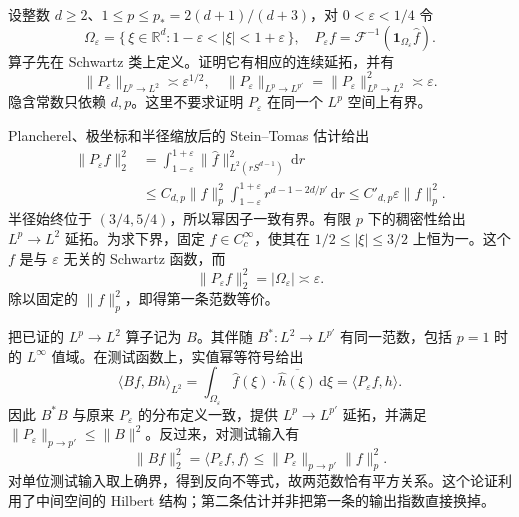 \begin{exercise}\label{b2:ex:23-new-3}
设整数 \(d\geq2\)、\(1\leq p\leq p_*=2(d+1)/(d+3)\)，对 \(0<\varepsilon<1/4\) 令
\[
 \Omega_\varepsilon=\{\,\xi\in\mathbb R^d:1-\varepsilon<|\xi|<1+\varepsilon\,\},
 \quad
 P_\varepsilon f=\mathcal F^{-1}(\mathbf1_{\Omega_\varepsilon}\widehat f).
\]
算子先在 Schwartz 类上定义。证明它有相应的连续延拓，并有
\[
 \|P_\varepsilon\|_{L^p\to L^2}\asymp\varepsilon^{1/2},
 \quad
 \|P_\varepsilon\|_{L^p\to L^{p'}}
   =\|P_\varepsilon\|_{L^p\to L^2}^2
   \asymp\varepsilon.
\]
隐含常数只依赖 \(d,p\)。这里不要求证明 \(P_\varepsilon\) 在同一个 \(L^p\) 空间上有界。
\end{exercise}
\begin{solution}
Plancherel、极坐标和半径缩放后的 Stein--Tomas 估计给出
\[
 \begin{aligned}
 \|P_\varepsilon f\|_2^2
 &=\int_{1-\varepsilon}^{1+\varepsilon}
       \|\widehat f\|_{L^2(rS^{d-1})}^2\,\mathrm dr\\
 &\leq C_{d,p}\|f\|_p^2
       \int_{1-\varepsilon}^{1+\varepsilon}
              r^{d-1-2d/p'}\,\mathrm dr
 \leq C'_{d,p}\varepsilon\|f\|_p^2.
 \end{aligned}
\]
半径始终位于 \((3/4,5/4)\)，所以幂因子一致有界。有限 \(p\) 下的稠密性给出 \(L^p\to L^2\) 延拓。为求下界，固定 \(\widehat f\in C_c^\infty\)，使其在 \(1/2\leq|\xi|\leq3/2\) 上恒为一。这个 \(f\) 是与 \(\varepsilon\) 无关的 Schwartz 函数，而
\[
 \|P_\varepsilon f\|_2^2=|\Omega_\varepsilon|\asymp\varepsilon.
\]
除以固定的 \(\|f\|_p^2\)，即得第一条范数等价。

把已证的 \(L^p\to L^2\) 算子记为 \(B\)。其伴随 \(B^*:L^2\to L^{p'}\) 有同一范数，包括 \(p=1\) 时的 \(L^\infty\) 值域。在测试函数上，实值幂等符号给出
\[
 \langle Bf,Bh\rangle_{L^2}
 =\int_{\Omega_\varepsilon}\widehat f(\xi)\cdot\overline{\widehat h(\xi)}\,\mathrm d\xi
 =\langle P_\varepsilon f,h\rangle.
\]
因此 \(B^*B\) 与原来 \(P_\varepsilon\) 的分布定义一致，提供 \(L^p\to L^{p'}\) 延拓，并满足 \(\|P_\varepsilon\|_{p\to p'}\leq\|B\|^2\)。反过来，对测试输入有
\[
 \|Bf\|_2^2
 =\langle P_\varepsilon f,f\rangle
 \leq\|P_\varepsilon\|_{p\to p'}\|f\|_p^2.
\]
对单位测试输入取上确界，得到反向不等式，故两范数恰有平方关系。这个论证利用了中间空间的 Hilbert 结构；第二条估计并非把第一条的输出指数直接换掉。
\end{solution}

